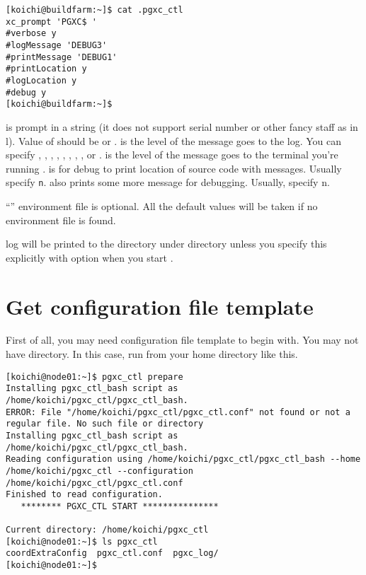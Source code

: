   \lstset{tabsize=8, xleftmargin=20pt, basicstyle=\ttfamily\scriptsize, breaklines=true}
  \begin{lstlisting}[frame=single]
[koichi@buildfarm:~]$ cat .pgxc_ctl
xc_prompt 'PGXC$ '
#verbose y
#logMessage 'DEBUG3'
#printMessage 'DEBUG1'
#printLocation y
#logLocation y
#debug y
[koichi@buildfarm:~]$
  \end{lstlisting}
  
   is  prompt in a string (it does not support serial number or other
  fancy staff as in l).
  Value of  should be  or .
   is the level of the message goes to the log.
  You can specify , , , , ,
  , , ,  or .
   is the level of the message goes to the terminal you're running .
   is for debug to print location of  source code with messages.
  Usually specify \texttt{n}.
   also prints some more message for debugging.
  Usually, specify n.
  
  ``'' environment file is optional.
  All the default values will be taken if no environment file is found.
  
   log will be printed to the directory  under  directory
  unless you specify this explicitly with  option when you start .



\section{Get configuration file template}

  First of all, you may need configuration file template to begin with.
  You may not have  directory.
  In this case, run  from your home directory like this.
  
  
  \begin{lstlisting}[frame=single]
[koichi@node01:~]$ pgxc_ctl prepare
Installing pgxc_ctl_bash script as /home/koichi/pgxc_ctl/pgxc_ctl_bash.
ERROR: File "/home/koichi/pgxc_ctl/pgxc_ctl.conf" not found or not a regular file. No such file or directory
Installing pgxc_ctl_bash script as /home/koichi/pgxc_ctl/pgxc_ctl_bash.
Reading configuration using /home/koichi/pgxc_ctl/pgxc_ctl_bash --home /home/koichi/pgxc_ctl --configuration /home/koichi/pgxc_ctl/pgxc_ctl.conf
Finished to read configuration.
   ******** PGXC_CTL START ***************

Current directory: /home/koichi/pgxc_ctl
[koichi@node01:~]$ ls pgxc_ctl
coordExtraConfig  pgxc_ctl.conf  pgxc_log/
[koichi@node01:~]$
  \end{lstlisting}
  
